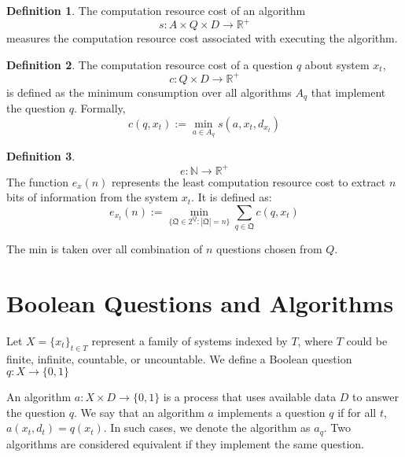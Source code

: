 \documentclass[11pt,a4paper]{article}
\theoremstyle{definition}
\newtheorem{defn}{Definition}[section]
\theoremstyle{remark}
\numberwithin{equation}{section}
\newcommand{\Real}{\mathbb R}
\newcommand{\Natural}{\mathbb N}
\begin{document}
\begin{defn}
The computation resource cost of an algorithm 
\begin{equation}
s: A \times Q \times D  \rightarrow \mathbb{R}^+ 
\end{equation}
 measures the computation resource cost associated with executing the algorithm.
 \end{defn}




\begin{defn}
The computation resource cost of a question $q$ about system $x_t$,
\begin{equation}
c: Q \times D  \rightarrow \mathbb{R}^+ 
\end{equation}
is defined as the minimum consumption over all algorithms \( A_q \) that implement the question \( q \).
Formally, 
\begin{equation}
 c(q,x_t)  := \min_{a \in A_q } s(a,x_t,d_{x_t}) 
\end{equation}

\end{defn}

\begin{defn}
\begin{equation}
e:\Natural \rightarrow \Real^+
\end{equation}
The function \( e_x(n) \) represents the least computation resource cost to extract \( n \) bits of information from the system \( x_t \).
It is defined as:
\begin{equation}
e_{x_t}(n) := \min_{\{\mathfrak{Q} \in 2^Q : |\mathfrak{Q}| = n\}} \sum_{q \in \mathfrak{Q}} c(q,x_t)
\end{equation}

The min is taken over all combination of $n$ questions chosen from \( Q \). 
\end{defn}



\section{Boolean Questions and Algorithms}
Let \(X = \{x_t\}_{t \in T}\) represent a family of systems indexed by \(T\), where \(T\) could be finite, infinite, countable, or uncountable. We define a Boolean question \(q: X \rightarrow \{0, 1\}\)

An algorithm \(a: X \times D \rightarrow \{0, 1\}\) is a process that uses available data \(D\) to answer the question \(q\). We say that an algorithm \(a\) implements a question \(q\) if for all \(t\), \(a(x_t, d_t) = q(x_t)\). In such cases, we denote the algorithm as \(a_q\). Two algorithms are considered equivalent if they implement the same question.
\end{document}
